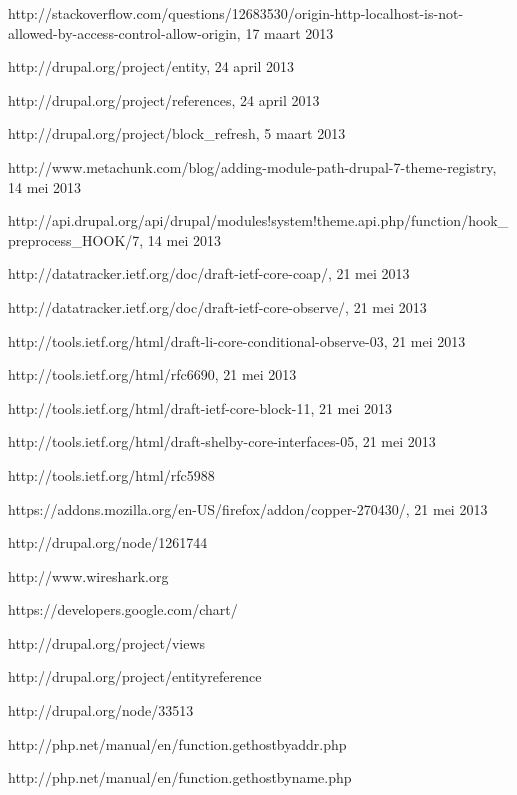 \begin{thebibliography}{99}
 http://stackoverflow.com/questions/12683530/origin-http-localhost-is-not-allowed-by-access-control-allow-origin, 17 maart 2013

 http://drupal.org/project/entity, 24 april 2013

 http://drupal.org/project/references, 24 april 2013

 http://drupal.org/project/block\_refresh, 5 maart 2013

 http://www.metachunk.com/blog/adding-module-path-drupal-7-theme-registry, 14 mei 2013

 http://api.drupal.org/api/drupal/modules!system!theme.api.php/function/hook\_preprocess\_HOOK/7, 14 mei 2013

 http://datatracker.ietf.org/doc/draft-ietf-core-coap/, 21 mei 2013

 http://datatracker.ietf.org/doc/draft-ietf-core-observe/, 21 mei 2013

 http://tools.ietf.org/html/draft-li-core-conditional-observe-03, 21 mei 2013

 http://tools.ietf.org/html/rfc6690, 21 mei 2013

 http://tools.ietf.org/html/draft-ietf-core-block-11, 21 mei 2013

 http://tools.ietf.org/html/draft-shelby-core-interfaces-05, 21 mei 2013

 http://tools.ietf.org/html/rfc5988

 https://addons.mozilla.org/en-US/firefox/addon/copper-270430/, 21 mei 2013

 http://drupal.org/node/1261744

 http://www.wireshark.org

 https://developers.google.com/chart/

 http://drupal.org/project/views

 http://drupal.org/project/entityreference

 http://drupal.org/node/33513

 http://php.net/manual/en/function.gethostbyaddr.php

 http://php.net/manual/en/function.gethostbyname.php

\end{thebibliography}

